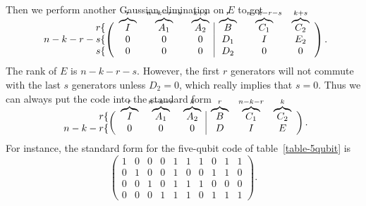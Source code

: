 Then we perform another Gaussian elimination on $E$ to get
\vspace{2.5ex}
\begin{equation}
	\begin{array}{r} r\{ \\ n-k-r-s \{ \\ s \{ \end{array} \!\!\!\!
	\left( \begin{array}{ccc|ccc}
		       \raisebox{0ex}[1.5ex]{$\overbrace{I}^r$} &
		       \raisebox{0ex}[1.5ex]{$\overbrace{A_1}^{n-k-r-s}$} &
		       \raisebox{0ex}[1.5ex]{$\overbrace{A_2}^{k+s}$} &
		       \raisebox{0ex}[1.5ex]{$\overbrace{B}^r$} &
		       \raisebox{0ex}[1.5ex]{$\overbrace{C_1}^{n-k-r-s}$} &
		       \raisebox{0ex}[1.5ex]{$\overbrace{C_2}^{k+s}$} \\
		       0 & 0 & 0 & D_1 & I & E_2 \\
		       0 & 0 & 0 & D_2 & 0 & 0
	\end{array} \right).
\end{equation}
The rank of $E$ is $n-k-r-s$.  However, the first $r$ generators will not
commute with the last $s$ generators unless $D_2 = 0$, which really implies
that $s=0$.  Thus we can always put the code into the standard form
\vspace{2.5ex}
\begin{equation}
	\begin{array}{r} r\{ \\ n-k-r\{ \end{array} \!\!\!\!
	\left( \begin{array}{ccc|ccc}
		       \raisebox{0ex}[1.5ex]{$\overbrace{I}^r$} &
		       \raisebox{0ex}[1.5ex]{$\overbrace{A_1}^{n-k-r}$} &
		       \raisebox{0ex}[1.5ex]{$\overbrace{A_2}^k$} &
		       \raisebox{0ex}[1.5ex]{$\overbrace{B}^r$} &
		       \raisebox{0ex}[1.5ex]{$\overbrace{C_1}^{n-k-r}$} &
		       \raisebox{0ex}[1.5ex]{$\overbrace{C_2}^k$} \\
		       0 & 0 & 0 & D & I & E
	\end{array} \right).
	\label{eq-standard-form}
\end{equation}
For instance, the standard form for the five-qubit code of
table~\ref{table-5qubit} is
\begin{equation}
	\left( \begin{array}{ccccc|ccccc}
		       1 & 0 & 0 & 0 & 1 & 1 & 1 & 0 & 1 & 1 \\
		       0 & 1 & 0 & 0 & 1 & 0 & 0 & 1 & 1 & 0 \\
		       0 & 0 & 1 & 0 & 1 & 1 & 1 & 0 & 0 & 0 \\
		       0 & 0 & 0 & 1 & 1 & 1 & 0 & 1 & 1 & 1
	\end{array} \right).
\end{equation}

